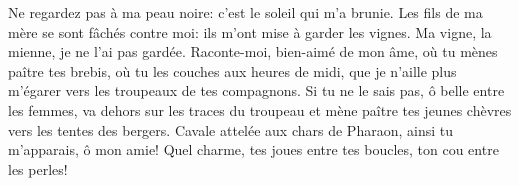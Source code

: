 Ne regardez pas à ma peau noire:
	c’est le soleil qui m’a brunie.
Les fils de ma mère se sont fâchés contre moi:
	ils m’ont mise à garder les vignes.
	Ma vigne, la mienne, je ne l’ai pas gardée.
Raconte-moi, bien-aimé de mon âme,
	où tu mènes paître tes brebis, où tu les couches aux heures de midi,
	que je n’aille plus m’égarer vers les troupeaux de tes compagnons.
Si tu ne le sais pas, ô belle entre les femmes,
	va dehors sur les traces du troupeau
	et mène paître tes jeunes chèvres vers les tentes des bergers.
Cavale attelée aux chars de Pharaon, ainsi tu m’apparais, ô mon amie!
	Quel charme, tes joues entre tes boucles, ton cou entre les perles!

